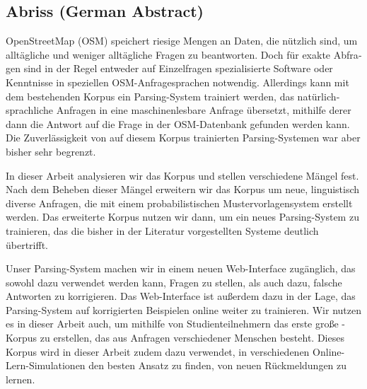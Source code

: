 \begin{otherlanguage}{ngerman}
\chapter{Abriss (German Abstract)}
\label{ch:abstract-german}

OpenStreetMap (OSM) speichert riesige Mengen an Daten, die nützlich sind, um
alltägliche und weniger alltägliche Fragen zu beantworten. Doch für exakte
Abfragen sind in der Regel entweder auf Einzelfragen spezialisierte Software
oder Kenntnisse in speziellen OSM-Anfragesprachen notwendig. Allerdings kann mit
dem bestehenden Korpus \nlmapstwo{} ein Parsing-System trainiert werden, das
natürlichsprachliche Anfragen in eine maschinenlesbare Anfrage übersetzt,
mithilfe derer dann die Antwort auf die Frage in der OSM-Datenbank gefunden
werden kann. Die Zuverlässigkeit von auf diesem Korpus trainierten
Parsing-Systemen war aber bisher sehr begrenzt.

In dieser Arbeit analysieren wir das Korpus \nlmapstwo{} und stellen
verschiedene Mängel fest. Nach dem Beheben dieser Mängel erweitern wir das
Korpus um neue, linguistisch diverse Anfragen, die mit einem probabilistischen
Mustervorlagensystem erstellt werden. Das erweiterte Korpus nutzen wir dann, um
ein neues Parsing-System zu trainieren, das die bisher in der Literatur
vorgestellten Systeme deutlich übertrifft.

Unser Parsing-System machen wir in einem neuen Web-Interface zugänglich, das
sowohl dazu verwendet werden kann, Fragen zu stellen, als auch dazu, falsche
Antworten zu korrigieren. Das Web-Interface ist außerdem dazu in der Lage, das
Parsing-System auf korrigierten Beispielen online weiter zu trainieren. Wir
nutzen es in dieser Arbeit auch, um mithilfe von Studienteilnehmern das erste
große \nlmaps{}-Korpus zu erstellen, das aus Anfragen verschiedener Menschen
besteht. Dieses Korpus wird in dieser Arbeit zudem dazu verwendet, in
verschiedenen Online-Lern-Simulationen den besten Ansatz zu finden, von neuen
Rückmeldungen zu lernen.

\end{otherlanguage}

